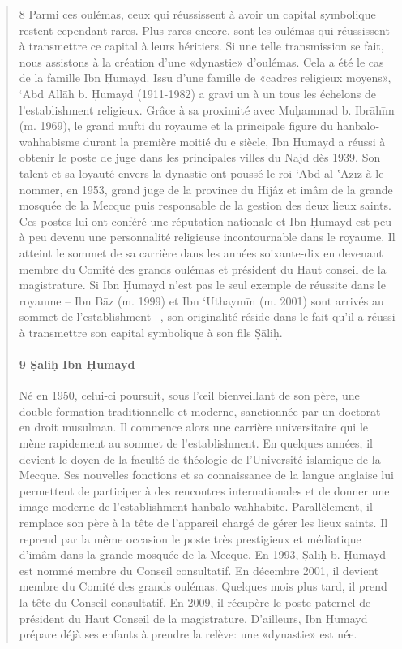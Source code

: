 \begin{quote}
8 Parmi ces oulémas, ceux qui réussissent à avoir un capital symbolique
restent cependant rares. Plus rares encore, sont les oulémas qui
réussissent à transmettre ce capital à leurs héritiers. Si une telle
transmission se fait, nous assistons à la création d'une «dynastie»
d'oulémas. Cela a été le cas de la famille Ibn Ḥumayd. Issu d'une
famille de «cadres religieux moyens», `Abd Allāh b. Ḥumayd (1911-1982) a
gravi un à un tous les échelons de l'establishment religieux. Grâce à sa
proximité avec Muḥammad b. Ibrāhīm (m. 1969), le grand mufti du royaume
et la principale figure du hanbalo- wahhabisme durant la première moitié
du e siècle, Ibn Ḥumayd a réussi à obtenir le poste de juge dans les
principales villes du Najd dès 1939. Son talent et sa loyauté envers la
dynastie ont poussé le roi `Abd al-‛Azīz à le nommer, en 1953, grand
juge de la province du Hijâz et imâm de la grande mosquée de la Mecque
puis responsable de la gestion des deux lieux saints. Ces postes lui ont
conféré une réputation nationale et Ibn Ḥumayd est peu à peu devenu une
personnalité religieuse incontournable dans le royaume. Il atteint le
sommet de sa carrière dans les années soixante-dix en devenant membre du
Comité des grands oulémas et président du Haut conseil de la
magistrature. Si Ibn Ḥumayd n'est pas le seul exemple de réussite dans
le royaume -- Ibn Bāz (m. 1999) et Ibn `Uthaymīn (m. 2001) sont arrivés
au sommet de l'establishment --, son originalité réside dans le fait
qu'il a réussi à transmettre son capital symbolique à son fils Ṣāliḥ.


\paragraph{9 Ṣāliḥ Ibn Ḥumayd}  Né en 1950, celui-ci poursuit, sous l'œil bienveillant de son père,
une double formation traditionnelle et moderne, sanctionnée par un
doctorat en droit musulman. Il commence alors une carrière universitaire
qui le mène rapidement au sommet de l'establishment. En quelques années,
il devient le doyen de la faculté de théologie de l'Université islamique
de la Mecque. Ses nouvelles fonctions et sa connaissance de la langue
anglaise lui permettent de participer à des rencontres internationales
et de donner une image moderne de l'establishment hanbalo-wahhabite.
Parallèlement, il remplace son père à la tête de l'appareil chargé de
gérer les lieux saints. Il reprend par la même occasion le poste très
prestigieux et médiatique d'imâm dans la grande mosquée de la Mecque. En
1993, Ṣāliḥ b. Ḥumayd est nommé membre du Conseil consultatif. En
décembre 2001, il devient membre du Comité des grands oulémas. Quelques
mois plus tard, il prend la tête du Conseil consultatif. En 2009, il
récupère le poste paternel de président du Haut Conseil de la
magistrature. D'ailleurs, Ibn Ḥumayd prépare déjà ses enfants à prendre
la relève: une «dynastie» est née.
\end{quote}

